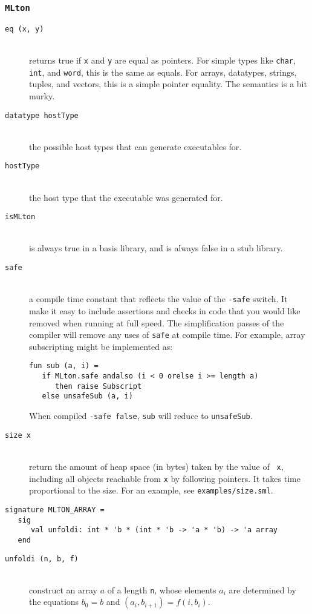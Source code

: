 \subsubsection{{\tt MLton}}

\newcommand{\entry}[1]{\item[\tt #1]\hspace{1in}\\}
\begin{description}

\entry{eq (x, y)}
returns true if {\tt x} and {\tt y} are equal as pointers.  For simple types
like {\tt char}, {\tt int}, and {\tt word}, this is the same as equals.  For
arrays, datatypes, strings, tuples, and vectors, this is a simple pointer
equality.  The semantics is a bit murky.

\entry{datatype hostType}
the possible host types that {\mlton} can generate executables for.

\entry{hostType}
the host type that the executable was generated for.

\entry{isMLton}
is always true in a {\mlton} basis library, and is always false in a stub
library.

\entry{safe}
a compile time constant that reflects the value of the {\tt -safe} switch.  It
make it easy to include assertions and checks in code that you would like
removed when running at full speed. The simplification passes of the compiler
will remove any uses of {\tt safe} at compile time.  For example, array
subscripting might be implemented as:
\begin{verbatim}
fun sub (a, i) =
   if MLton.safe andalso (i < 0 orelse i >= length a)
      then raise Subscript
   else unsafeSub (a, i)
\end{verbatim}
When compiled {\tt -safe false}, {\tt sub} will reduce to
{\tt unsafeSub}.

\entry{size x}
return the amount of heap space (in bytes) taken by the value of {\tt
x}, including all objects reachable from {\tt x} by following
pointers.  It takes time proportional to the size.  For an example,
see {\tt examples/size.sml}.

\end{description}

\begin{verbatim}
signature MLTON_ARRAY =
   sig
      val unfoldi: int * 'b * (int * 'b -> 'a * 'b) -> 'a array
   end
\end{verbatim}

\begin{description}

\entry{unfoldi (n, b, f)}
construct an array $a$ of a length {\tt n}, whose elements $a_i$ are determined
by the equations $b_0 = b$ and $(a_i, b_{i+1}) = f (i, b_i)$.

\end{description}

